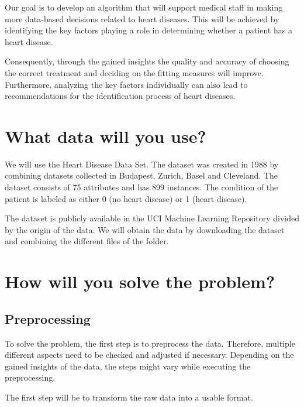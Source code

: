 \documentclass[11pt,titlepage,oneside,openany]{book}
\begin{document}
Our goal is to develop an algorithm that will support medical staff in making more data-based decisions related to heart diseases. This will be achieved by identifying the key factors playing a role in determining whether a patient has a heart disease. 

Consequently, through the gained insights the quality and accuracy of choosing the correct treatment and deciding on the fitting measures will improve. Furthermore, analyzing the key factors individually can also lead to recommendations for the identification process of heart diseases. 


\section{What data will you use?}
\label{sec:data}

We will use the Heart Disease Data Set. The dataset was created in 1988 by combining datasets collected in Budapest, Zurich, Basel and Cleveland. The dataset consists of 75 attributes and has 899 instances. The condition of the patient is labeled as either 0 (no heart disease) or 1 (heart disease).

The dataset is publicly available in the UCI Machine Learning Repository \cite{janosi1988} divided by the origin of the data. We will obtain the data by downloading the dataset and combining the different files of the folder.

\section{How will you solve the problem?}
\label{cha:solve}

\subsection{Preprocessing}
To solve the problem, the first step is to preprocess the data. Therefore, multiple different aspects need to be checked and adjusted if necessary. Depending on the gained insights of the data, the steps might vary while executing the preprocessing. 

The first step will be to transform the raw data into a usable format.
\end{document}
